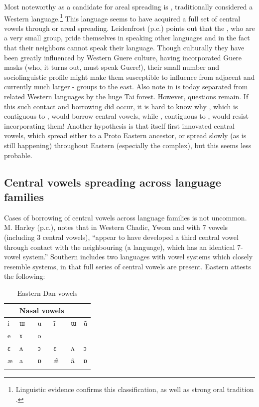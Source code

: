 \documentclass[output=paper,newtxmath,modfonts,nonflat]{langsci/langscibook}
\begin{document}
Most noteworthy as a candidate for areal spreading is , traditionally considered a Western  language.\footnote{Linguistic evidence confirms this classification, as well as strong oral tradition \citep{centredetraduction2013}.} This language seems to have acquired a full set of central vowels through  or areal spreading.  Leidenfrost (p.c.) points out that the , who are a very small group, pride themselves in speaking other languages and in the fact that their neighbors cannot speak their language.  Though culturally they have been greatly influenced by Western Guere culture, having incorporated Guere masks (who, it turns out, must speak Guere!), their small number and sociolinguistic profile might make them susceptible to influence from adjacent and currently much larger -  groups to the east. Also note in   is today separated from related Western languages by the huge Tai forest. However, questions remain. If this such contact and borrowing did occur, it is hard to know why , which is contiguous to , would borrow central vowels, while , contiguous to , would resist incorporating them! Another hypothesis is that  itself first innovated central vowels, which spread either to a Proto Eastern  ancestor, or spread slowly (as is still happening) throughout Eastern  (especially the  complex), but this seems less probable.   

\subsection{Central vowels spreading across language families}\label{sec:zogbo:5.2} 

Cases of borrowing of central vowels across language families is not uncommon. M. Harley (p.c.), notes that in Western Chadic, Ywom and  with 7 vowels (including 3 central vowels), “appear to have developed a third central vowel through contact with the neighbouring  (a  language), which has an identical 7-vowel system.”  Southern  includes two  languages with vowel systems which closely resemble  systems, in that full series of central vowels are present. Eastern  attests the following: 

\begin{table}
\caption{Eastern Dan vowels \citep{Vydrine2009}}
\label{tab:zogbo:24}
\begin{tabular}{llp{2cm}lll}
\lsptoprule
\multicolumn{3}{l}{Oral vowels} &     \multicolumn{3}{l}{Nasal vowels}\\
\midrule
i & ɯ & u  &  ĩ & ɯ & ũ\\

e & ɤ & o\\

ɛ & ʌ & ɔ  &  ɛ & ʌ & ɔ\\

æ & a & ɒ  &  \~{æ} & ã & ɒ\\
\lspbottomrule
\end{tabular}
\end{table}
\end{document}
